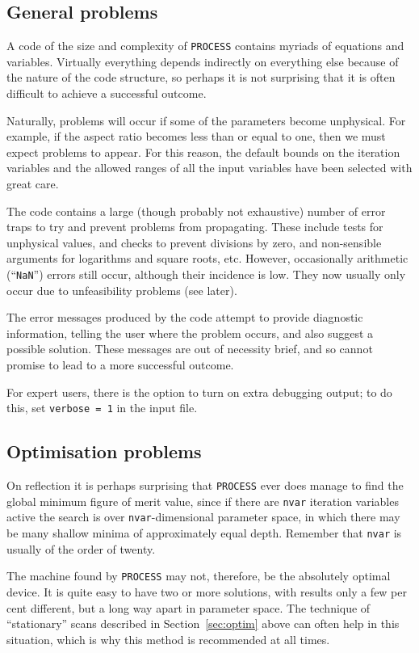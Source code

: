 \documentclass[11pt,a4paper]{report}
\newcommand{\process}{\mbox{\texttt{PROCESS}}}
\begin{document}
\subsection{General problems}

A code of the size and complexity of \process\/ contains myriads of equations
and variables. Virtually everything depends indirectly on everything else
because of the nature of the code structure, so perhaps it is not surprising
that it is often difficult to achieve a successful outcome.

Naturally, problems will occur if some of the parameters become unphysical.
For example, if the aspect ratio becomes less than or equal to one, then we
must expect problems to appear. For this reason, the default bounds on the
iteration variables and the allowed ranges of all the input variables have
been selected with great care.

The code contains a large (though probably not exhaustive) number of error
traps to try and prevent problems from propagating. These include tests for
unphysical values, and checks to prevent divisions by zero, and non-sensible
arguments for logarithms and square roots, etc. However, occasionally
arithmetic (``\texttt{NaN}'') errors still occur, although their incidence is
low. They now usually only occur due to unfeasibility problems (see later).

The error messages produced by the code attempt to provide diagnostic
information, telling the user where the problem occurs, and also suggest a
possible solution. These messages are out of necessity brief, and so cannot
promise to lead to a more successful outcome.

For expert users, there is the option to turn on extra debugging output; to do
this, set \texttt{verbose = 1} in the input file.

\subsection{Optimisation problems}

On reflection it is perhaps surprising that \process\/ ever does manage to
find the global minimum figure of merit value, since if there are
\texttt{nvar} iteration variables active the search is over
\texttt{nvar}-dimensional parameter space, in which there may be many shallow
minima of approximately equal depth. Remember that \texttt{nvar} is usually of
the order of twenty.

The machine found by \process\/ may not, therefore, be the absolutely optimal
device. It is quite easy to have two or more solutions, with results only a
few per cent different, but a long way apart in parameter space. The technique
of ``stationary'' scans described in Section~\ref{sec:optim} above can often
help in this situation, which is why this method is recommended at all times.
\end{document}
